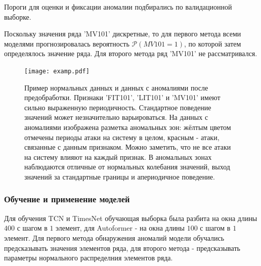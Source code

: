 \documentclass{article}
\begin{document}
Пороги для оценки и фиксации аномалии подбирались по валидационной выборке. 

Поскольку значения ряда 'MV101' дискретные, то для первого метода всеми моделями прогнозировалась вероятность $\mathcal{P} (MV101 = 1)$, по которой затем определялось значение ряда. Для второго метода ряд 'MV101' не рассматривался. 

\begin{figure}[h]
    	\centering
    \texttt{[image: examp.pdf]}
 	\caption{Пример нормальных данных и данных с аномалиями после предобработки. Признаки 'FIT101', 'LIT101' и 'MV101' имеют сильно выраженную периодичность. Стандартное поведение значений может незначительно варьироваться. На данных с аномалиями изображена разметка аномальных зон: жёлтым цветом отмечены периоды атаки на систему в целом, красным - атаки, связанные с данным признаком. Можно заметить, что не все атаки на систему влияют на каждый признак. В аномальных зонах наблюдаются отличные от нормальных колебания значений, выход значений за стандартные границы и апериодичное поведение.}
 \label{example}
\end{figure}

\subsubsection{Обучение и применение моделей}
Для обучения TCN и TimesNet обучающая выборка была разбита на окна длины $400$ с шагом в $1$ элемент, для Autoformer - на окна длины $100$ с шагом в $1$ элемент. Для первого метода обнаружения аномалий модели обучались предсказывать значения элементов ряда, для второго метода - предсказывать параметры нормального распределния элементов ряда. 
\end{document}
